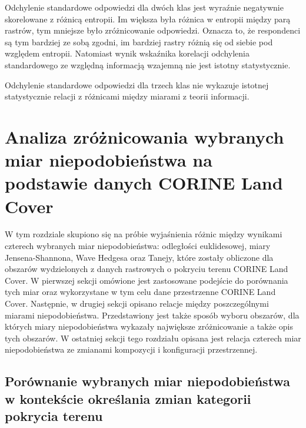 \documentclass{amuthesis}
\begin{document}
Odchylenie standardowe odpowiedzi dla dwóch klas jest wyraźnie
negatywnie skorelowane z różnicą entropii. Im większa była różnica w
entropii między parą rastrów, tym mniejsze było zróżnicowanie
odpowiedzi. Oznacza to, że respondenci są tym bardziej ze sobą zgodni,
im bardziej rastry różnią się od siebie pod względem entropii. Natomiast
wynik wskaźnika korelacji odchylenia standardowego ze względną
informacją wzajemną nie jest istotny statystycznie.

Odchylenie standardowe odpowiedzi dla trzech klas nie wykazuje istotnej
statystycznie relacji z różnicami między miarami z teorii informacji.


\hypertarget{analiza-zruxf3ux17cnicowania-wybranych-miar-niepodobieux144stwa-na-podstawie-danych-corine-land-cover}{%
\chapter{Analiza zróżnicowania wybranych miar niepodobieństwa na
podstawie danych CORINE Land
Cover}\label{analiza-zruxf3ux17cnicowania-wybranych-miar-niepodobieux144stwa-na-podstawie-danych-corine-land-cover}}

W tym rozdziale skupiono się na próbie wyjaśnienia różnic między
wynikami czterech wybranych miar niepodobieństwa: odległości
euklidesowej, miary Jensena-Shannona, Wave Hedgesa oraz Tanejy, które
zostały obliczone dla obszarów wydzielonych z danych rastrowych o
pokryciu terenu CORINE Land Cover. W pierwszej sekcji omówione jest
zastosowane podejście do porównania tych miar oraz wykorzystane w tym
celu dane przestrzenne CORINE Land Cover. Następnie, w drugiej sekcji
opisano relacje między poszczególnymi miarami niepodobieństwa.
Przedstawiony jest także sposób wyboru obszarów, dla których miary
niepodobieństwa wykazały największe zróżnicowanie a także opis tych
obszarów. W ostatniej sekcji tego rozdziału opisana jest relacja
czterech miar niepodobieństwa ze zmianami kompozycji i konfiguracji
przestrzennej.

\hypertarget{poruxf3wnanie-wybranych-miar-niepodobieux144stwa-w-kontekux15bcie-okreux15blania-zmian-kategorii-pokrycia-terenu}{%
\section{Porównanie wybranych miar niepodobieństwa w kontekście
określania zmian kategorii pokrycia
terenu}\label{poruxf3wnanie-wybranych-miar-niepodobieux144stwa-w-kontekux15bcie-okreux15blania-zmian-kategorii-pokrycia-terenu}}
\end{document}
